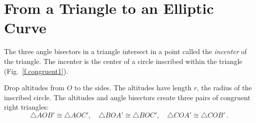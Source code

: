\section{From a Triangle to an Elliptic Curve}\label{s.elliptic}

The three angle bisectors in a triangle intersect in a point called the \emph{incenter} of the triangle. The incenter is the center of a circle inscribed within the triangle  (Fig.~\ref{f.congruent1}). 

Drop altitudes from $O$ to the sides. The altitudes have length $r$, the radius of the inscribed circle. The altitudes and angle bisectors create three pairs of congruent right triangles:
\[
\triangle AOB'\cong \triangle AOC',\quad \triangle BOA'\cong \triangle BOC',\quad \triangle COA'\cong \triangle COB'\,.
\]

